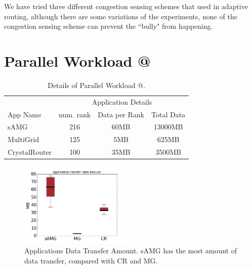 \documentclass[conference,compsoc]{IEEEtran}
\makeatletter
\newcommand{\Rmnum}[1]{\expandafter\@slowromancap\romannumeral #1@}
\makeatother
\begin{document}
We have tried three different congestion sensing schemes that used in adaptive routing\cite{won-prog-adaptive}, although there are some variations of the experiments, none of the congestion sensing scheme can prevent the ``bully" from happening.

\section{Parallel Workload \Rmnum{2 }}

\begin{table}[ht]
\begin{center}
\caption{Details of Parallel Workload \Rmnum{2 }.} 
\label{tab: parallel workload-2}
\begin{tabular}{l c c c }
\toprule %
\toprule
&\multicolumn{3}{c}{Application Details} \\ %
\cmidrule(l){2-4}
App Name & num. rank & Data per Rank & Total Data\\ %
\midrule %
sAMG  &    216 &   60MB   &     13000MB\\ %
\midrule
MultiGrid  &    125 &   5MB   &     625MB\\ 
\midrule
CrystalRouter  &   100  &  35MB    &     3500MB\\ 

\midrule %
\bottomrule %
\end{tabular}
\end{center}
\end{table}


\begin{figure}[h!]
  \centering
  \includegraphics[width = 0.48\textwidth ]{syn-wkld/data_amount}
  \caption{Applications Data Transfer Amount. sAMG has the most amount of data transfer, compared with CR and MG.}
  \label{fig:syn-3app-data-amount}
\end{figure}
\end{document}
